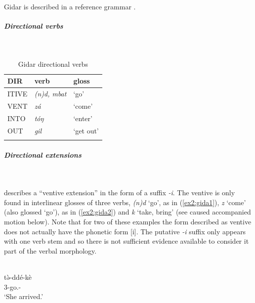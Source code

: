 Gidar is described in a reference grammar \citep{frajzyngierGrammarGidar2008}. 

\subparagraph{Directional verbs}~

\begin{table}[H]
	\caption{Gidar directional verbs} 
	\label{tab:gidaV}
	\begin{tabular}{lll} %
		\lsptoprule
		DIR & verb & gloss   \\ %
		\midrule
		ITIVE & \textit{(n)d, mbat} & `go' \\
		VENT & \textit{zá} & `come' \\
		INTO& \textit{tóŋ} & `enter' \\
		OUT & \textit{gil} & `get out' \\
		\lspbottomrule
	\end{tabular}
\end{table}

\subparagraph{Directional extensions}~


\citet[196--198]{frajzyngierGrammarGidar2008} describes a ``ventive extension'' in the form of a suffix \textit{-i}. The ventive is only found in interlinear glosses of three verbs, \textit{(n)d} `go', as in (\ref{ex2:gida1}), \textit{z} `come' (also glossed `go'), as in (\ref{ex2:gida2}) and \textit{k} `take, bring' (see caused accompanied motion below). Note that for two of these examples the form described as ventive does not actually have the phonetic form [i]. The putative \textit{-i} suffix only appears with one verb stem and so there is not sufficient evidence available to consider it part of the verbal morphology.  

\ea\label{ex2:gida1}
 \\
\gll tə̀-ddé-kè \\
3-go.- \\
\glt `She arrived.'

